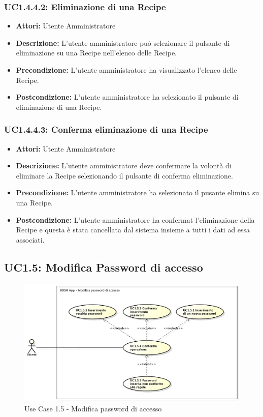 \subsubsection{UC1.4.4.2: Eliminazione di una Recipe}

\begin{itemize}
    \item \textbf{Attori:} Utente Amministratore
    \item \textbf{Descrizione:} L'utente amministratore può selezionare il pulsante di eliminazione su una Recipe nell'elenco delle Recipe.
    \item \textbf{Precondizione:} L'utente amministratore ha visualizzato l'elenco delle Recipe.
    \item \textbf{Postcondizione:} L'utente amministratore ha selezionato il pulsante di eliminazione di una Recipe.
\end{itemize}
\subsubsection{UC1.4.4.3: Conferma eliminazione di una Recipe}

\begin{itemize}
    \item \textbf{Attori:} Utente Amministratore
    \item \textbf{Descrizione:} L'utente amministratore deve confermare la volontà di eliminare la Recipe selezionando il pulsante di conferma eliminazione.
    \item \textbf{Precondizione:} L'utente amministratore ha selezionato il pusante elimina su una Recipe.
    \item \textbf{Postcondizione:} L'utente amministratore ha confermat l'eliminazione della Recipe e questa è stata cancellata dal sistema insieme a tutti i dati ad essa associati.
\end{itemize}

\clearpage


\subsection{UC1.5: Modifica Password di accesso}

\begin{figure}[!htbp]
    \centering
    \centerline{\includegraphics[scale=0.4]{./images/UC1_5.pdf}}
    \caption{Use Case 1.5 - Modifica password di accesso}
\end{figure}

